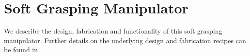 \section{Soft Grasping Manipulator}
\label{sec:soft_grasping_manipulator}
We describe the design, fabrication and functionality of this soft grasping manipulator. Further details on the underlying design and fabrication recipes can be found in \cite{marchese2015recipe}.

